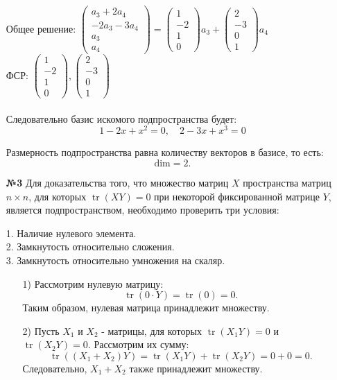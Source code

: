 \documentclass[a4paper]{article}
\newcommand{\mat}[1]{\begin{pmatrix} #1 \end{pmatrix}}
\begin{document}
\begin{enumerate}
    Общее решение: $\mat{a_3+2a_4\\-2a_3-3a_4\\a_3\\a_4} = \mat{1\\-2\\1\\0}a_3+\mat{2\\-3\\0\\1}a_4$ \\
    ФСР: $\mat{1\\-2\\1\\0}, \mat{2\\-3\\0\\1}$\\\\
    Следовательно базис искомого подпространства будет:
    $$
        1-2x+x^2=0, \quad
        2-3x+x^3=0
    $$
    
    Размерность подпространства равна количеству векторов в базисе, то есть:
    $$
    \text{dim} = 2.
    $$

    \item[\textbf{№3}]Для доказательства того, что множество матриц $ X $ пространства матриц $ n \times n $, для которых $ \operatorname{tr}(X Y) = 0 $ при некоторой фиксированной матрице $ Y $, является подпространством, необходимо проверить три условия:

    1. Наличие нулевого элемента.\\
    2. Замкнутость относительно сложения.\\
    3. Замкнутость относительно умножения на скаляр.\\

    \begin{enumerate}
        \item[1)]
        Рассмотрим нулевую матрицу:
        $$
        \operatorname{tr}(0 \cdot Y) = \operatorname{tr}(0) = 0.
        $$
        Таким образом, нулевая матрица принадлежит множеству.\\
        
        \item[2)]
        Пусть $ X_1 $ и $ X_2 $ - матрицы, для которых $ \operatorname{tr}(X_1 Y) = 0 $ и $ \operatorname{tr}(X_2 Y) = 0 $. Рассмотрим их сумму:
        $$
        \operatorname{tr}((X_1 + X_2) Y) = \operatorname{tr}(X_1 Y) + \operatorname{tr}(X_2 Y) = 0 + 0 = 0.
        $$
        Следовательно, $ X_1 + X_2 $ также принадлежит множеству.\\
    

\end{enumerate}
\end{enumerate}
\end{document}
